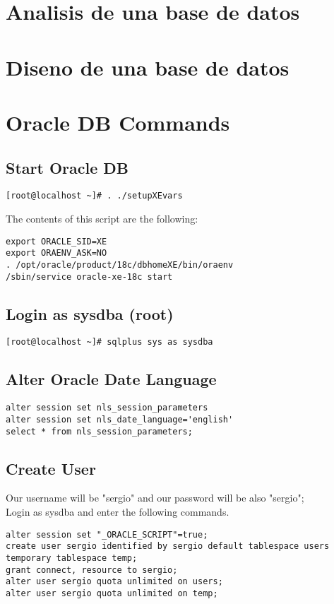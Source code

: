 \documentclass[twoside]{article}
\begin{document}
\section{Analisis de una base de datos}
\section{Diseno de una base de datos}


\section{Oracle DB Commands}

\subsection{Start Oracle DB}

\begin{verbatim}
[root@localhost ~]# . ./setupXEvars
\end{verbatim}
The contents of this script are the following:

\begin{verbatim}
export ORACLE_SID=XE
export ORAENV_ASK=NO
. /opt/oracle/product/18c/dbhomeXE/bin/oraenv
/sbin/service oracle-xe-18c start
\end{verbatim}

\subsection{Login as sysdba (root)}
\begin{verbatim}
[root@localhost ~]# sqlplus sys as sysdba
\end{verbatim}
\subsection{Alter Oracle Date Language}
\begin{verbatim}
alter session set nls_session_parameters
alter session set nls_date_language='english'
select * from nls_session_parameters;
\end{verbatim}
\subsection{Create User}
Our username will be "sergio" and our password will be also "sergio"; \\
Login as sysdba and enter the following commands.
\begin{verbatim}
alter session set "_ORACLE_SCRIPT"=true;
create user sergio identified by sergio default tablespace users temporary tablespace temp;
grant connect, resource to sergio;
alter user sergio quota unlimited on users;
alter user sergio quota unlimited on temp;
\end{verbatim}
\end{document}
